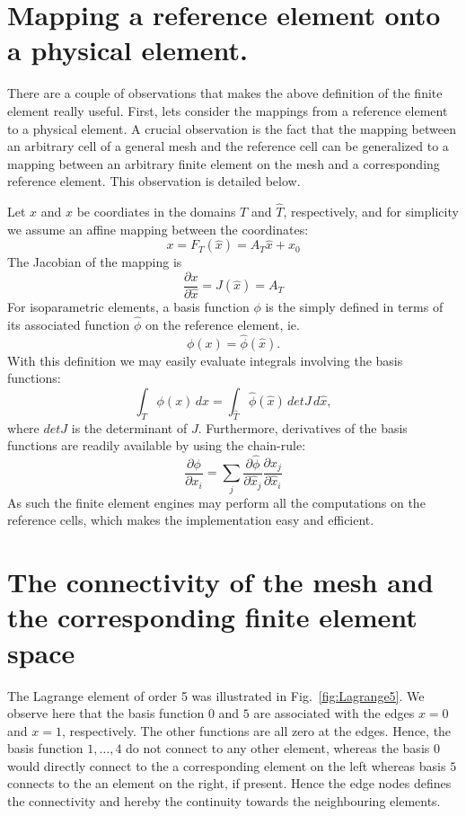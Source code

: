 \section{Mapping a reference element onto a physical element. }

There are a couple of observations that makes the above definition of the finite element really useful.
First, lets consider the mappings from a reference element to a physical element. A crucial observation
is the fact that 
the mapping between an arbitrary cell of a general mesh and the reference cell can be generalized to 
a mapping between an arbitrary finite element on the mesh and a corresponding reference element.  
This observation is detailed below. 

Let $x$ and $\hat{x}$ be coordiates in the domains $T$ and $\hat{T}$, respectively, and  
for simplicity we assume an affine mapping between the coordinates:  
\[
x = F_T(\hat{x}) = A_T \hat{x} + x_0   
\]
The Jacobian of the mapping is 
\[
\frac{\partial x}{\partial \hat{x}} = J(\hat{x}) = A_T      
\]
For isoparametric elements, a basis function $\phi$
is the simply defined in terms of its associated function $\hat{\phi}$
on the reference
element, ie. 
\[
\phi(x) = \hat{\phi}(\hat{x}) .  
\]
With this definition we may easily evaluate integrals involving the basis functions: 
\[
\int_T \phi(x) \, dx = \int_{\hat{T}} \hat{\phi}(\hat{x}) \, det J \, d\hat{x},  
\]
where $det J$ is the determinant of $J$.  Furthermore, derivatives of the basis functions are readily available by using the chain-rule:  
\[
\frac{\partial \phi}{\partial x_i } = \sum_j  \frac{\partial \hat{\phi}}{\partial \hat{x}_j } \frac{\partial \hat{x}_j}{\partial \hat{x}_i } 
\]
As such the finite element engines may perform all the computations on the reference cells, which makes the implementation easy and efficient. 

\section{The connectivity of the mesh and the corresponding finite element space}

The Lagrange element of order 5 was illustrated in Fig.~\ref{fig:Lagrange5}. We observe here that the basis function $0$ and $5$ are associated
with the edges $x=0$ and $x=1$, respectively. The other functions are all zero at the edges. Hence, the basis function $1, \ldots, 4$ do not connect 
to any other element, whereas the basis $0$ would directly connect to the a corresponding element on the left whereas basis $5$ connects to the 
an element on the right, if present. Hence the edge nodes defines the connectivity and hereby the continuity towards the neighbouring elements. 

